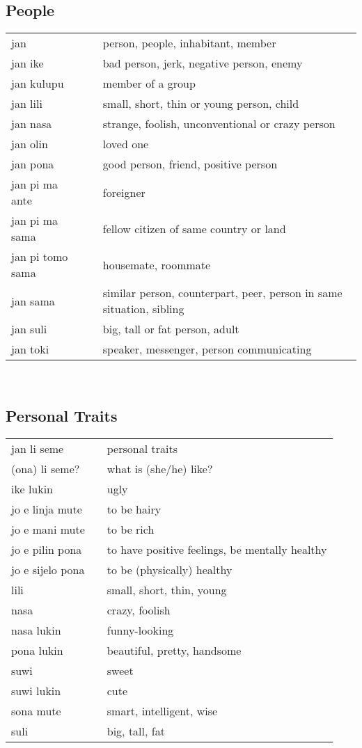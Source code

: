 \subsection{People}
%
\begin{supertabular}{p{4,5cm}|ll}
jan && person, people, inhabitant, member \\
jan ike && bad person, jerk, negative person, enemy \\
jan kulupu && member of a group \\
jan lili && small, short, thin or young person, child \\
jan nasa && strange, foolish, unconventional or crazy person \\
jan olin && loved one \\
jan pona && good person, friend, positive person \\
jan pi ma ante && foreigner \\
jan pi ma sama && fellow citizen of same country or land \\
jan pi tomo sama && housemate, roommate \\
jan sama && similar person, counterpart, peer, person in same situation, sibling \\
jan suli && big, tall or fat person, adult \\
jan toki && speaker, messenger, person communicating \\
\end{supertabular} \\
%
%
\subsection{Personal Traits}
%
\begin{supertabular}{p{4,5cm}|ll}
jan li seme\ && personal traits \\
(ona) li seme? && what is (she/he) like? \\
ike lukin && ugly \\
jo e linja mute && to be hairy \\
jo e mani mute && to be rich \\
jo e pilin pona && to have positive feelings, be mentally healthy \\
jo e sijelo pona && to be (physically) healthy \\
lili && small, short, thin, young \\
nasa && crazy, foolish \\
nasa lukin && funny-looking \\
pona lukin && beautiful, pretty, handsome \\
suwi && sweet \\
suwi lukin && cute \\
sona mute && smart, intelligent, wise \\
suli && big, tall, fat \\
\end{supertabular} \\
%
%
